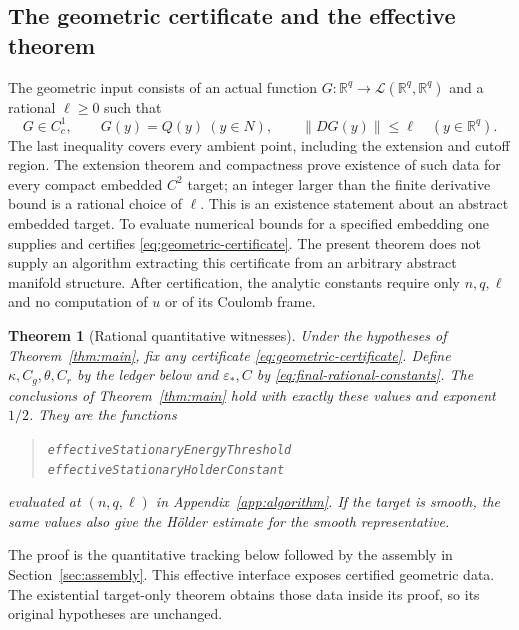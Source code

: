 \documentclass[11pt,a4paper]{article}
\numberwithin{equation}{section}
\newtheorem{theorem}{Theorem}[section]
\theoremstyle{definition}
\theoremstyle{remark}
\newcommand{\R}{\mathbb R}
\newcommand{\norm}[1]{\left\lVert#1\right\rVert}
\newcommand{\lean}[1]{\nolinkurl{#1}}
\begin{document}
\subsection{The geometric certificate and the effective theorem}
The geometric input consists of an actual function
$G:\R^q\to\mathcal L(\R^q,\R^q)$ and a rational $\ell\geq0$ such that
\begin{equation}\label{eq:geometric-certificate}
 G\in C_c^1,\qquad G(y)=Q(y)\ (y\in N),\qquad
 \norm{DG(y)}\leq\ell\quad(y\in\R^q).
\end{equation}
The last inequality covers every ambient point, including the extension
and cutoff region. The extension theorem and compactness prove existence
of such data for every compact embedded $C^2$ target; an integer larger
than the finite derivative bound is a rational choice of $\ell$.
This is an existence statement about an abstract embedded target.
To evaluate numerical bounds for a specified embedding one supplies and
certifies \eqref{eq:geometric-certificate}. The present theorem does not
supply an algorithm extracting this certificate from an arbitrary abstract
manifold structure. After certification, the analytic constants require
only $n,q,\ell$ and no computation of $u$ or of its Coulomb frame.

\begin{theorem}[Rational quantitative witnesses]\label{thm:effective}
Under the hypotheses of Theorem~\ref{thm:main}, fix any certificate
\eqref{eq:geometric-certificate}. Define $\kappa,C_g,\theta,C_r$ by the
ledger below and $\varepsilon_*,C$ by
\eqref{eq:final-rational-constants}. The conclusions of
Theorem~\ref{thm:main} hold with exactly these values and exponent $1/2$.
They are the functions
\begin{quote}
\lean{effectiveStationaryEnergyThreshold}\\
\lean{effectiveStationaryHolderConstant}
\end{quote}
evaluated at $(n,q,\ell)$ in Appendix~\ref{app:algorithm}. If the target is smooth, the same values
also give the H\"older estimate for the smooth representative.
\end{theorem}
The proof is the quantitative tracking below followed by the assembly in
Section~\ref{sec:assembly}. This effective interface exposes certified
geometric data. The existential target-only theorem obtains those data
inside its proof, so its original hypotheses are unchanged.
\end{document}
